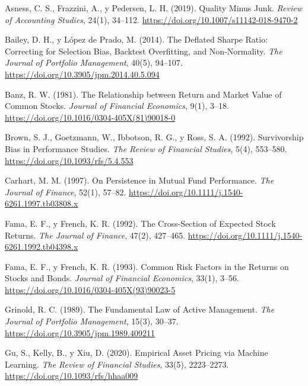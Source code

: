 \begin{list}{}{%
  \setlength{\leftmargin}{2em}%
  \setlength{\itemindent}{-2em}%
  \setlength{\itemsep}{0.6em}%
  \setlength{\parsep}{0pt}%
}

\item Asness, C. S., Frazzini, A., y Pedersen, L. H. (2019). Quality Minus Junk.
  \textit{Review of Accounting Studies}, 24(1), 34--112.
  \url{https://doi.org/10.1007/s11142-018-9470-2}

\item Bailey, D. H., y López de Prado, M. (2014). The Deflated Sharpe Ratio: Correcting for
  Selection Bias, Backtest Overfitting, and Non-Normality.
  \textit{The Journal of Portfolio Management}, 40(5), 94--107.
  \url{https://doi.org/10.3905/jpm.2014.40.5.094}

\item Banz, R. W. (1981). The Relationship between Return and Market Value of Common Stocks.
  \textit{Journal of Financial Economics}, 9(1), 3--18.
  \url{https://doi.org/10.1016/0304-405X(81)90018-0}

\item Brown, S. J., Goetzmann, W., Ibbotson, R. G., y Ross, S. A. (1992). Survivorship Bias in
  Performance Studies. \textit{The Review of Financial Studies}, 5(4), 553--580.
  \url{https://doi.org/10.1093/rfs/5.4.553}

\item Carhart, M. M. (1997). On Persistence in Mutual Fund Performance.
  \textit{The Journal of Finance}, 52(1), 57--82.
  \url{https://doi.org/10.1111/j.1540-6261.1997.tb03808.x}

\item Fama, E. F., y French, K. R. (1992). The Cross-Section of Expected Stock Returns.
  \textit{The Journal of Finance}, 47(2), 427--465.
  \url{https://doi.org/10.1111/j.1540-6261.1992.tb04398.x}

\item Fama, E. F., y French, K. R. (1993). Common Risk Factors in the Returns on Stocks and Bonds.
  \textit{Journal of Financial Economics}, 33(1), 3--56.
  \url{https://doi.org/10.1016/0304-405X(93)90023-5}

\item Grinold, R. C. (1989). The Fundamental Law of Active Management.
  \textit{The Journal of Portfolio Management}, 15(3), 30--37.
  \url{https://doi.org/10.3905/jpm.1989.409211}

\item Gu, S., Kelly, B., y Xiu, D. (2020). Empirical Asset Pricing via Machine Learning.
  \textit{The Review of Financial Studies}, 33(5), 2223--2273.
  \url{https://doi.org/10.1093/rfs/hhaa009}


\end{list}
